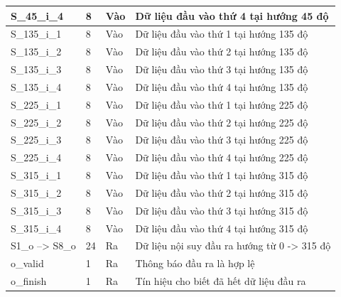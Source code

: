 \begin{table}[H]
\begin{tabular}{|p{3cm} p{2cm} p{2cm} p{8cm}|}
        S\_45\_i\_4 & 8 & Vào & Dữ liệu đầu vào thứ 4 tại hướng 45 độ \\
        \hline
        S\_135\_i\_1 & 8 & Vào & Dữ liệu đầu vào thứ 1 tại hướng 135 độ \\
        \hline
        S\_135\_i\_2 & 8 & Vào & Dữ liệu đầu vào thứ 2 tại hướng 135 độ \\
        \hline
        S\_135\_i\_3 & 8 & Vào & Dữ liệu đầu vào thứ 3 tại hướng 135 độ \\
        \hline
        S\_135\_i\_4 & 8 & Vào & Dữ liệu đầu vào thứ 4 tại hướng 135 độ \\
        \hline
        S\_225\_i\_1 & 8 & Vào & Dữ liệu đầu vào thứ 1 tại hướng 225 độ \\
        \hline
        S\_225\_i\_2 & 8 & Vào & Dữ liệu đầu vào thứ 2 tại hướng 225 độ \\
        \hline
        S\_225\_i\_3 & 8 & Vào & Dữ liệu đầu vào thứ 3 tại hướng 225 độ \\
        \hline
        S\_225\_i\_4 & 8 & Vào & Dữ liệu đầu vào thứ 4 tại hướng 225 độ \\
        \hline
        S\_315\_i\_1 & 8 & Vào & Dữ liệu đầu vào thứ 1 tại hướng 315 độ \\
        \hline
        S\_315\_i\_2 & 8 & Vào & Dữ liệu đầu vào thứ 2 tại hướng 315 độ \\
        \hline
        S\_315\_i\_3 & 8 & Vào & Dữ liệu đầu vào thứ 3 tại hướng 315 độ \\
        \hline
        S\_315\_i\_4 & 8 & Vào & Dữ liệu đầu vào thứ 4 tại hướng 315 độ \\
        \hline
        S1\_o --> S8\_o & 24 & Ra & Dữ liệu nội suy đầu ra hướng từ 0 -> 315 độ \\
        \hline
        o\_valid & 1 & Ra & Thông báo đầu ra là hợp lệ\\
        \hline
        o\_finish & 1 & Ra & Tín hiệu cho biết đã hết dữ liệu đầu ra \\
        \hline
    \end{tabular}

    \label{tab:signalListInterpolation}
\end{table}












